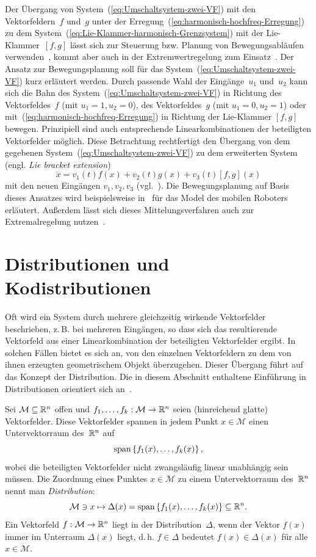 Der Übergang von System~(\ref{eq:Umschaltsystem-zwei-VF}) mit den
Vektorfeldern~$f$ und~$g$ unter der Erregung~(\ref{eq:harmonisch-hochfreq-Erregung})
zu dem System~(\ref{eq:Lie-Klammer-harmonisch-Grenzsystem}) mit
der Lie-Klammer~$[f,g]$ lässt sich zur Steuerung bzw. Planung von
Bewegungsabläufen verwenden~\cite{sussmann1991cdc,lafferriere1993,kumar1999},
kommt aber auch in der Extremwertregelung zum Einsatz~\cite{duerr2013}.\nocite{nof1999}
Der Ansatz zur Bewegungsplanung soll für das System~(\ref{eq:Umschaltsystem-zwei-VF})
kurz erläutert werden. Durch passende Wahl der Eingänge~$u_{1}$
und~$u_{2}$ kann sich die Bahn des System~(\ref{eq:Umschaltsystem-zwei-VF})
in Richtung des Vektorfeldes~$f$ (mit $u_{1}=1,u_{2}=0$), des Vektorfeldes~$g$
(mit $u_{1}=0,u_{2}=1$) oder mit~(\ref{eq:harmonisch-hochfreq-Erregung})
in Richtung der Lie-Klammer $[f,g]$ bewegen. Prinzipiell sind auch
entsprechende Linearkombinationen der beteiligten Vektorfelder möglich.
Diese Betrachtung rechtfertigt den Übergang von dem gegebenen System~(\ref{eq:Umschaltsystem-zwei-VF})
zu dem erweiterten System (engl. \emph{Lie bracket extension})
\[
\dot{x}=v_{1}(t)f(x)+v_{2}(t)g(x)+v_{3}(t)[f,g](x)
\]
mit den neuen Eingängen $v_{1},v_{2},v_{3}$ (vgl.~\cite{sussmann1993}).
Die Bewegungsplanung auf Basis dieses Ansatzes wird beispielsweise
in~\cite{duleba1999} für das Model des mobilen Roboters erläutert.
Außerdem lässt sich dieses Mittelungsverfahren auch zur Extremalregelung
nutzen~\cite{duerr2013}.

\section{Distributionen und Kodistributionen\label{sec:Distributionen-und-Kodistributionen}}

Oft wird ein System durch mehrere gleichzeitig wirkende Vektorfelder
beschrieben, z.\,B. bei mehreren Eingängen, so dass sich das resultierende
Vektorfeld aus einer Linearkombination der beteiligten Vektorfelder
ergibt. In solchen Fällen bietet es sich an, von den einzelnen Vektorfeldern
zu dem von ihnen erzeugten geometrischem Objekt überzugehen. Dieser
Übergang führt auf das Konzept der Distribution. Die in diesem Abschnitt
enthaltene Einführung in Distributionen orientiert sich an~\cite[Abschnitt~{1.3}]{isidori3}.

Sei $\mathcal{M}\subseteq{\mathbb{R}}^{n}$ offen und $f_{1},\ldots,f_{k}:\mathcal{M}\to{\mathbb{R}}^{n}$
seien (hinreichend glatte) Vektorfelder. Diese Vektorfelder spannen
in jedem Punkt $x\in\mathcal{M}$ einen Untervektorraum des~${\mathbb{R}}^{n}$
auf 
\begin{equation}
{\operatorname{span}}\left\{ f_{1}(x),\ldots,f_{k}(x)\right\} ,\label{eq:VF-spannen-Dist-auf}
\end{equation}
wobei die beteiligten Vektorfelder nicht zwangsläufig linear unabhängig
sein müssen. Die Zuordnung eines Punktes $x\in\mathcal{M}$ zu einem
Untervektorraum des~${\mathbb{R}}^{n}$ nennt man \emph{Distribution}:
\[
\mathcal{M}\ni x\mapsto\Delta(x)={\operatorname{span}}\left\{ f_{1}(x),\ldots,f_{k}(x)\right\} \subseteq{\mathbb{R}}^{n}.
\]
Ein Vektorfeld $f:\mathcal{M}\to{\mathbb{R}}^{n}$ liegt in der Distribution~$\Delta$,
wenn der Vektor $f(x)$ immer im Unterraum $\Delta(x)$ liegt, d.\,h.
$f\in\Delta$ bedeutet $f(x)\in\Delta(x)$ für alle $x\in\mathcal{M}$.


